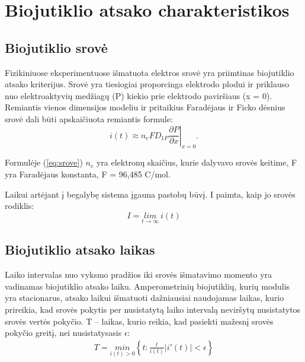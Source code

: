 \documentclass[12pt, a4paper, lithuanian]{article}
\begin{document}
\section{Biojutiklio atsako charakteristikos}
\subsection{Biojutiklio srovė}

Fizikiniuose eksperimentuose išmatuota elektros srovė yra priimtinas
biojutiklio atsako kriterijus. Srovė yra tiesiogiai proporcinga elektrodo
plodui ir priklauso nuo elektroaktyvių medžiagų (P)
kiekio prie elektrodo paviršiaus (x = 0). Remiantis vienos dimensijos modeliu
ir pritaikius Faradėjaus ir Ficko dėsnius srovė dali būti apskaičiuota
remiantis formule:
\begin{equation}
    \label{eq:srove}
    \left. i(t) \approx n_eFD_{1P}\frac{\partial P}{\partial x} \right|_{x=0}.
\end{equation}

Formulėje (\ref{eq:srove}) $n_e$ yra elektronų skaičius, kurie dalyvavo srovės
keitime, F yra Faradėjaus konstanta, F = 96,485 C/mol.

Laikui artėjant į begalybę sistema įgauna pastobų būvį. I paimta, kaip jo
srovės rodiklis:
\begin{equation}
    I = \underset{t \to \infty}{lim} \ i(t)
\end{equation}

\subsection{Biojutiklio atsako laikas}

Laiko intervalas nuo vyksmo pradžios iki srovės išmatavimo momento yra
vadinamas biojutiklio atsako laiku. Amperometrinių biojutiklių, kurių modulis
yra stacionarus, atsako laikui išmatuoti dažniausiai naudojamas laikas, kurio
prireikia, kad srovės pokytis per nusistatytą laiko intervalą neviršytų
nusistatytos srovės vertės pokyčio. T – laikas, kurio reikia, kad pasiekti
mažesnį srovės pokyčio greitį, nei nusistatysasis $\epsilon$:
\begin{equation} 
\begin{aligned}
    T = \underset{i(t)>0}{min}\left\{t:\frac{t}{i(t)} \left| i'(t)
    \right| < \epsilon \right\}
\end{aligned}
\end{equation}
\end{document}
